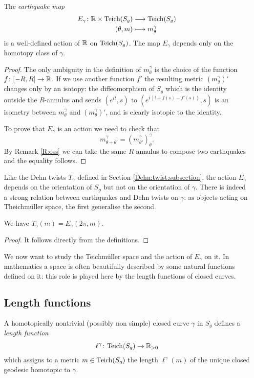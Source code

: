 \begin{prop}
The \emph{earthquake map}
\begin{align*}
E_\gamma\colon \mathbb{R} \times {\rm Teich}(S_g) & \longrightarrow {\rm Teich}(S_g) \\
 (\theta, m) & \longmapsto m_\theta^{\gamma} 
\end{align*}
is a well-defined action of $\mathbb{R}$ on ${\rm Teich}(S_g)$. The map $E_\gamma$ depends only on the homotopy class of $\gamma$.
\end{prop}
\begin{proof}
The only ambiguity in the definition of $m_\theta^\gamma$ is the choice of the function $f\colon [-R,R] \to \mathbb{R}$. If we use another function $f'$ the resulting metric $(m_\theta^\gamma)'$ changes only by an isotopy: the diffeomorphism of $S_g$ which is the identity outside the $R$-annulus and sends $(e^{it},s)$ to $(e^{i(t+f(s)-f'(s))},s)$ is an isometry between $m_\theta^\gamma$ and $(m_\theta^\gamma)'$, and is clearly isotopic to the identity.

To prove that $E_\gamma$ is an action we need to check that 
$$m_{\theta+\theta'}^{\gamma} = \left(m_{\theta'}^\gamma\right)_\theta^\gamma.$$
By Remark \ref{R:oss} we can take the same $R$-annulus to compose two earthquakes and the equality follows.
\end{proof}

Like the Dehn twists $T_\gamma$ defined in Section \ref{Dehn:twist:subsection}, the action $E_\gamma$ depends on the orientation of $S_g$ but not on the orientation of $\gamma$. There is indeed a strong relation between earthquakes and Dehn twists on $\gamma$: as objects acting on Theichm\"uller space, the first generalise the second.

\begin{prop} \label{root:prop}
We have $T_\gamma(m) = E_\gamma(2\pi,m)$.
\end{prop}
\begin{proof}
It follows directly from the definitions.
\end{proof}

We now want to study the Teichm\"uller space and the action of $E_\gamma$ on it. In mathematics a space is often beautifully described by some natural functions defined on it: this role is played here by the length functions of closed curves.

\subsection{Length functions}
A homotopically nontrivial (possibly non simple) closed curve $\gamma$ in $S_g$ defines a \emph{length function}
$$\ell^\gamma\colon {\rm Teich}(S_g) \to \mathbb{R}_{>0}$$
which assigns to a metric $m\in{\rm Teich}(S_g)$ the length $\ell^\gamma(m)$ of the unique closed geodesic homotopic to $\gamma$. 

